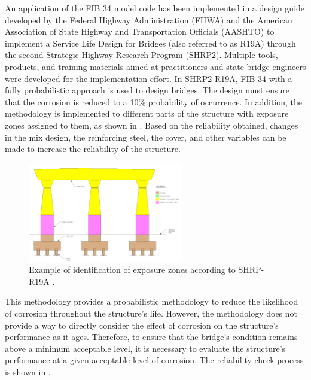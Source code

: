An application of the FIB 34 model code has been implemented in a design guide developed by the Federal Highway Administration (FHWA) and the  American Association of State Highway and Transportation Officials (AASHTO) to implement a Service Life Design for Bridges (also referred to as R19A) through the second Strategic Highway Research Program (SHRP2)\cite{SHRP22019}. Multiple tools, products, and training materials aimed at practitioners and state bridge engineers were developed for the implementation effort. In SHRP2-R19A, FIB 34 with a fully probabilistic approach is used to design bridges. The design must ensure that the corrosion is reduced to a 10\% probability of occurrence. In addition, the methodology is implemented to different parts of the structure with exposure zones assigned to them, as shown in . Based on the reliability obtained, changes in the mix design, the reinforcing steel, the cover, and other variables can be made to increase the reliability of the structure. 

\begin{figure}[htbp]
	\centering
	\includegraphics[width=0.6\textwidth]{VAC Thesis 2.0/Chapter-6/figs/SHRP_exposure_example.jpg}
	\caption{Example of identification of exposure zones according to SHRP-R19A \cite{SHRP22019}.}
	\label{fig:FIB_34_Exposure zones}
\end{figure}


This methodology provides a probabilistic methodology to reduce the likelihood of corrosion throughout the structure's life. However, the methodology does not provide a way to directly consider the effect of corrosion on the structure's performance as it ages. Therefore, to ensure that the bridge's condition remains above a minimum acceptable level, it is necessary to evaluate the structure's performance at a given acceptable level of corrosion. The reliability check process is shown in .

